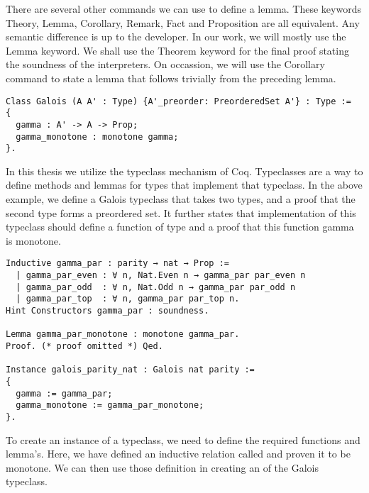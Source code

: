 There are several other commands we can use to define a lemma. These keywords 
Theory, Lemma, Corollary, Remark, Fact and Proposition are all equivalent. Any
semantic difference is up to the developer. In our work, we will mostly use the
Lemma keyword. We shall use the Theorem keyword for the final proof stating the
soundness of the interpreters. On occassion, we will use the Corollary command
to state a lemma that follows trivially from the preceding lemma.

\begin{verbatim}
Class Galois (A A' : Type) {A'_preorder: PreorderedSet A'} : Type :=
{
  gamma : A' -> A -> Prop;
  gamma_monotone : monotone gamma;
}.
\end{verbatim}

In this thesis we utilize the typeclass mechanism of Coq. Typeclasses are a way
to define methods and lemmas for types that implement that typeclass. In the
above example, we define a Galois typeclass that takes two types, and a proof
that the second type  forms a preordered set. It further states that
implementation of this typeclass should define a function  of type
 and a proof that this function gamma is monotone.

\begin{verbatim}
Inductive gamma_par : parity → nat → Prop :=
  | gamma_par_even : ∀ n, Nat.Even n → gamma_par par_even n
  | gamma_par_odd  : ∀ n, Nat.Odd n → gamma_par par_odd n
  | gamma_par_top  : ∀ n, gamma_par par_top n.
Hint Constructors gamma_par : soundness.

Lemma gamma_par_monotone : monotone gamma_par.
Proof. (* proof omitted *) Qed.

Instance galois_parity_nat : Galois nat parity :=
{
  gamma := gamma_par;
  gamma_monotone := gamma_par_monotone;
}.
\end{verbatim}

To create an instance of a typeclass, we need to define the required functions
and lemma's. Here, we have defined an inductive relation called 
and proven it to be monotone. We can then use those definition in creating an
 of the Galois typeclass.

